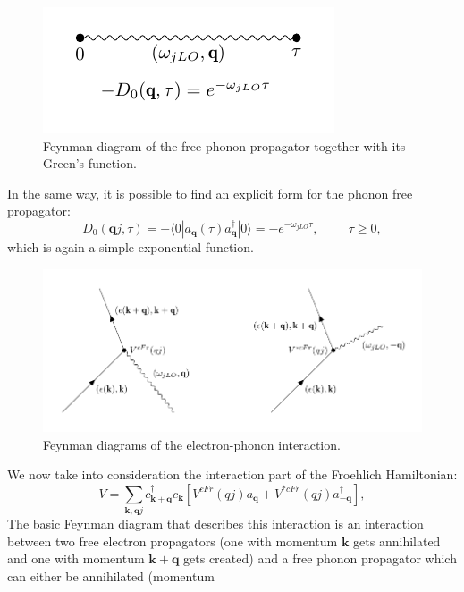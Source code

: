 \begin{figure}[H]
    \centering
    \includegraphics[scale=1]{free_ph_propagator.pdf}
    \caption{Feynman diagram of the free phonon propagator together with its Green's function.}
    \label{fig:ph_prop_free}
\end{figure}
In the same way, it is possible to find an explicit form for the phonon free propagator:
\begin{equation}
    D_0(\mathbf{q}j,\tau)=-\langle 0|a_\mathbf{q}(\tau)a^\dagger_\mathbf{q}|0\rangle=-e^{-\omega_{jLO}\tau},\hspace{1cm}\tau\ge0,
\end{equation}
which is again a simple exponential function.
\begin{figure}[H]
    \centering
    \includegraphics[scale=1.0]{interaction_vertex.pdf}
    \caption{Feynman diagrams of the electron-phonon interaction.}
    \label{fig:interaction_vertex}
\end{figure}
We now take into consideration the interaction part of the Froehlich Hamiltonian:
\begin{equation}
    V=\sum_{\mathbf{k},\mathbf{q}j}c^\dagger_{\mathbf{k+q}}c_{\mathbf{k}}\left[V^{cFr}(qj)a_\mathbf{q}+V^{*cFr}(qj)a^\dagger_\mathbf{-q}\right],
    \label{polaron_interacting}
\end{equation}
The basic Feynman diagram that describes this interaction is an interaction between two free electron propagators (one with momentum 
$\mathbf{k}$ gets annihilated and one with momentum $\mathbf{k+q}$ gets created) and a free phonon propagator which can either be annihilated (momentum 
